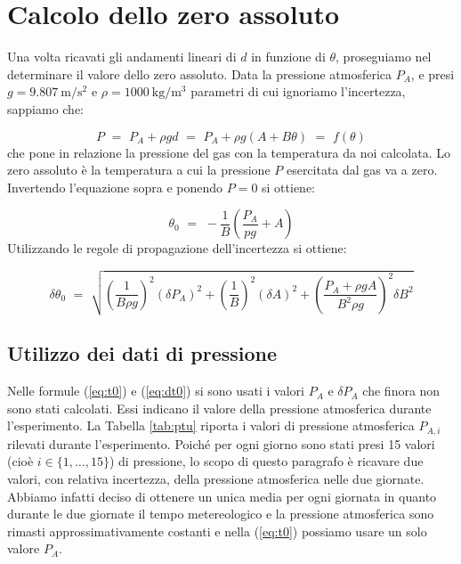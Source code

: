 \section{Calcolo dello zero assoluto}

Una volta ricavati gli andamenti lineari di $d$ in funzione di $\theta$, proseguiamo nel determinare il valore dello zero assoluto.
Data la pressione atmosferica $P_A$, e presi $g = \SI{9.807}{\meter\per\square\second}$ e
$\rho = \SI{1000}{\kilo\gram\per\cubic\metre}$ parametri di cui ignoriamo l'incertezza, sappiamo che:

\begin{equation}
	P \,\, = \,\, P_A + \rho g d \,\, = \,\, P_A + \rho g (A + B \theta) \,\, = \,\, f(\theta)
\end{equation}
%
che pone in relazione la pressione del gas con la temperatura da noi calcolata. Lo zero assoluto è la temperatura a cui la
pressione $P$ esercitata dal gas va a zero. Invertendo l'equazione sopra e ponendo $P = 0$ si ottiene:

\begin{equation}
	\theta_0 \,\, = \,\, - \frac{1}{B} \left( \frac{P_A}{pg} + A \right)
    \label{eq:t0}
\end{equation}
%
Utilizzando le regole di propagazione dell'incertezza si ottiene:

\begin{equation}
    \delta \theta_0 \,\, = \,\, \sqrt{\left(\frac{1}{B \rho g}\right)^2 (\delta P_A)^2 +
    \left(\frac{1}{B}\right)^2 (\delta A)^2 + \left(\frac{P_A + \rho g A}{B^2 \rho g} \right)^2 \delta B^2}
    \label{eq:dt0}
\end{equation}


\subsection{Utilizzo dei dati di pressione}
\label{press}

Nelle formule (\ref{eq:t0}) e (\ref{eq:dt0}) si sono usati i valori $P_A$ e $\delta P_A$ che finora non sono stati calcolati.
Essi indicano il valore della pressione atmosferica durante l'esperimento. La Tabella \ref{tab:ptu} riporta i valori di pressione atmosferica
$P_{A,i}$ rilevati durante l'esperimento. Poiché per ogni giorno sono stati presi 15 valori (cioè $i \in \{1, \dots, 15\}$)
di pressione, lo scopo di questo paragrafo è ricavare due valori, con relativa incertezza, della pressione atmosferica nelle
due giornate. Abbiamo infatti deciso di ottenere un unica media per ogni giornata in quanto durante le due giornate il tempo metereologico e la
pressione atmosferica sono rimasti approssimativamente costanti e nella (\ref{eq:t0}) possiamo usare un solo valore $P_A$.

